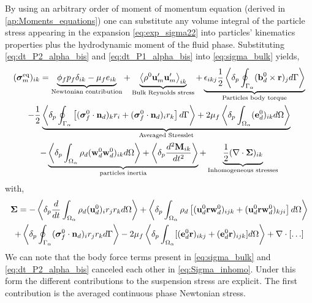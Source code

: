By using an arbitrary order of moment of momentum equation (derived in \ref{ap:Moments_equations}) one can substitute any volume integral of the particle stress appearing in the expansion \ref{eq:exp_sigma22} into particles' kinematics   properties plus the hydrodynamic moment of the fluid phase. 
Substituting \ref{eq:dt_P2_alpha_bis} and \ref{eq:dt_P1_alpha_bis} into \ref{eq:sigma_bulk} yields, 
\begin{multline}
    (\bm{\sigma}^\text{eq}_m)_{ik}
    = 
    \underbrace{
        \phi_f p_f 
    \delta_{ik}
    - \mu_f e_{ik} 
    }_\text{Newtonian contribution}
    + \underbrace{\avg{\rho^0 \textbf{u}'_m\textbf{u}'_m}_{ik}}_\text{Bulk Reynolds stress}
    + \underbrace{\epsilon_{ikj} \frac{1}{2}\pSavg{ (\textbf{b}_d^0 \times \textbf{r})_j}}_\text{Particles body torque}\\
    - \frac{1}{2}\underbrace{\pSavg{\left[
        (\bm{\sigma}_f^0 \cdot \textbf{n}_d)_kr_i  
        + (\bm{\sigma}_f^0 \cdot \textbf{n}_d)_i r_k
    \right]}
    + 2 \mu_f \pOavg{(\textbf{e}_d^0)_{ik}}}_\text{Averaged Stresslet}\\
    - \underbrace{\pOavg{ \rho_d (\textbf{w}_d^0\textbf{w}_d^0  )_{ik}}
    + \pavg{\frac{d^2 \textbf{M}_{ik}}{dt^2}  }}_\text{particles inertia}
    + \underbrace{\frac{1}{2} (\div\bm{\Sigma})_{ik}}_\text{Inhomogeneous stresses}
    \label{eq:stress_bulk_explicit}
\end{multline}
with,
\begin{multline}
    \bm{\Sigma}
    = 
    - \pavg{\ddt\intO{ \rho_d (\textbf{u}_d^0)_i r_j r_k }}
    + \pOavg{ 
        \rho_d \left[
        (\textbf{u}^0_d\textbf{r}\textbf{w}_d^0)_{ijk} +  (\textbf{u}^0_d\textbf{r}\textbf{w}_d^0)_{kji}
    \right]
    }\\
    +\pSavg{  (\bm{\sigma}_f^0 \cdot \textbf{n}_d)_i r_{j}  r_{k}  }
    - 2 \mu_f \pOavg{[( \textbf{e}_d^0 \textbf{r})_{ikj}
    + ( \textbf{e}_d^0 \textbf{r})_{ijk}]} + \div[\ldots]
    \label{eq:Sigma_inhomo}
\end{multline}
We can note that the body force terms present in \ref{eq:sigma_bulk} and \ref{eq:dt_P2_alpha_bis} canceled each other in \ref{eq:Sigma_inhomo}. 
Under this form the different contributions to the suspension stress are explicit. 
The first contribution is the averaged continuous phase Newtonian stress. 
